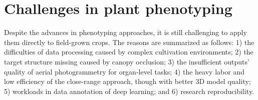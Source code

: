 


\section{Challenges in plant phenotyping}

Despite the advances in phenotyping approaches, it is still challenging to apply them directly to field-grown crops. The reasons are summarized as follows: 
1) the difficulties of data processing caused by complex cultivation environments; 
2) the target structure missing caused by canopy occlusion; 
3) the insufficient outputs' quality of aerial photogrammetry for organ-level tasks; 
4) the heavy labor and low efficiency of the close-range approach, though with better 3D model quality;
5) workloads in data annotation of deep learning; 
and 6) research reproducibility.

